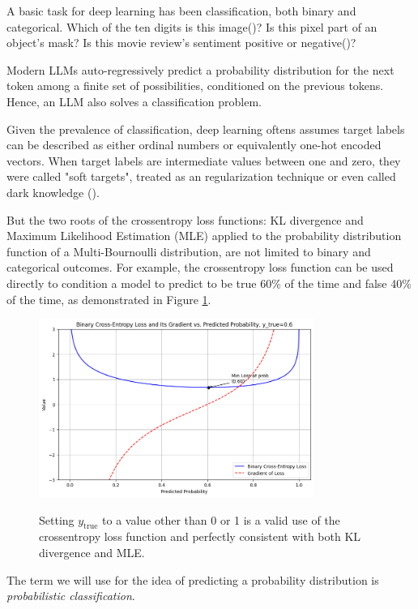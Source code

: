 \documentclass[twoside,11pt]{article}
\begin{document}
A basic task for deep learning has been classification, both
binary and categorical. Which of the ten digits is this image(\cite{lecun1998mnist})?
Is this pixel
part of an object's mask? Is this movie review's sentiment positive or
negative(\cite{Pang+Lee:04a})? 

Modern LLMs auto-regressively predict a probability distribution for 
the next token among a finite set of possibilities, conditioned on the 
previous tokens. Hence, an LLM also solves 
a classification problem. 

Given the prevalence of classification, deep learning oftens assumes
target labels can be described as either ordinal numbers
or equivalently one-hot encoded vectors. When target labels are
intermediate values between one and zero, they were called "soft targets", 
treated as an regularization technique or even called dark knowledge
(\cite{hinton2015distilling, szegedy2016rethinking,hinton2014dark}). 

But the two roots of the crossentropy
loss functions: KL divergence and Maximum Likelihood Estimation (MLE) applied
to the probability distribution function of a Multi-Bournoulli
distribution, are not limited to binary and categorical outcomes. 
For example, the crossentropy loss function can be used directly 
to condition a model to predict to be true 60\% of the time and false 40\% of 
the time, as demonstrated in Figure \ref{fig:ce06}. 
\begin{figure}[htbp]
  \centering
  \includegraphics[width=0.8\textwidth]{ce06.png}
  \label{fig:ce06}
  \caption{Setting $y_\mathrm{true}$ to a value 
  other than 0 or 1 is a valid 
  use of the crossentropy loss 
  function and perfectly consistent with
  both KL divergence and MLE.}
\end{figure}

The term we will use for the idea of
predicting a probability distribution is \emph{probabilistic classification}.
\end{document}
